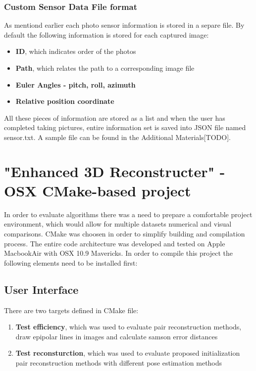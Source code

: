 \subsubsection{Custom Sensor Data File format}
As mentiond earlier each photo sensor information is stored in a separe file. By default the following information is stored for each captured image:
\begin{itemize}
\item \textbf{ID}, which indicates order of the photos
\item \textbf{Path}, which relates the path to a corresponding image file
\item \textbf{Euler Angles - pitch, roll, azimuth}
\item \textbf{Relative position coordinate}
\end{itemize} 
All these pieces of information are stored as a list and when the user has completed taking pictures, entire information set is saved into JSON file named sensor.txt. A sample file can be found in the Additional Materials[TODO].\pagebreak

\section{"Enhanced 3D Reconstructer" - OSX CMake-based project}
In order to evaluate algorithms there was a need to prepare a comfortable project environment, which would allow for multiple datasets numerical and visual comparisons. CMake was choosen in order to simplify building and compilation process. The entire code architecture was developed and tested on Apple MacbookAir with OSX 10.9 Mavericks. In order to compile this project the following elements need to be installed first:
\subsection{User Interface}
There are two targets defined in CMake file:
\begin{enumerate}
\item \textbf{Test efficiency}, which was used to evaluate pair reconstruction methods, draw epipolar lines in images and calculate samson error distances
\item \textbf{Test reconsturction}, which was used to evaluate proposed initialization pair reconstruction methods with different pose estimation methods
\end{enumerate}
